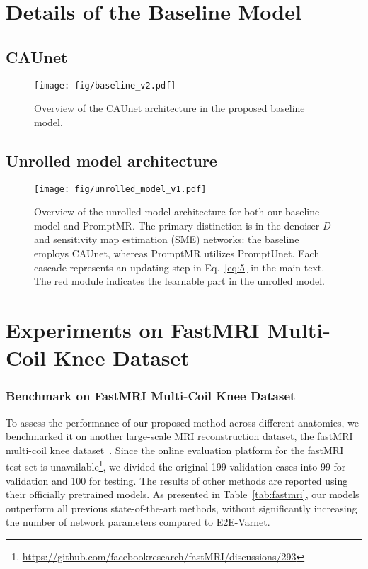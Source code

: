 \documentclass[runningheads]{llncs}
\begin{document}
{


\section{Details of the Baseline Model}
\label{app:baseline}

\subsection{CAUnet}
\label{app:ca-unet}


\begin{figure*}[ht]
\centering
\texttt{[image: fig/baseline\_v2.pdf]}
\caption{Overview of the CAUnet architecture in the proposed baseline model.}
\label{fig:baseline}
\end{figure*}

\subsection{Unrolled model architecture}
\label{app:unrolled_model}



\begin{figure*}[ht]
\centering
\texttt{[image: fig/unrolled\_model\_v1.pdf]}
\caption{Overview of the unrolled model architecture for both our baseline model and PromptMR. The primary distinction is in the denoiser $D$ and sensitivity map estimation (SME) networks: the baseline employs CAUnet, whereas PromptMR utilizes PromptUnet. Each cascade represents an updating step in Eq.~\ref{eq:5} in the main text. The red module indicates the learnable part in the unrolled model.}
\label{fig:unroll}
\end{figure*}

\section{Experiments on FastMRI Multi-Coil Knee Dataset}
\label{app:add_exp}
\subsubsection{Benchmark on FastMRI Multi-Coil Knee Dataset}
To assess the performance of our proposed method across different anatomies, we benchmarked it on another large-scale MRI reconstruction dataset, the fastMRI multi-coil knee dataset~\cite{zbontar2018fastmri}. Since the online evaluation platform for the fastMRI test set is unavailable\setcounter{footnote}{0}\footnote{\url{https://github.com/facebookresearch/fastMRI/discussions/293}}, we divided the original 199 validation cases into 99 for validation and 100 for testing. The results of other methods are reported using their officially pretrained models. As presented in Table~\ref{tab:fastmri}, our models outperform all previous state-of-the-art methods, without significantly increasing the number of network parameters compared to E2E-Varnet.\\

}
\end{document}

